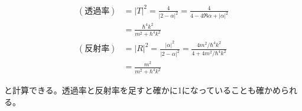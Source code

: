 \documentclass[uplatex,dvipdfmx]{jsarticle}
\begin{document}
\begin{align}
    (透過率) &= |T|^2 = \frac{4}{|2-\alpha|^2}
    = \frac{4}{4-4\Re{\alpha}+|\alpha|^2}\\
    &= \frac{\hbar^4k^2}{m^2+\hbar^4k^2} \\
    (反射率) &= |R|^2 = \frac{|\alpha|^2}{|2-\alpha|^2} = \frac{4m^2/\hbar^4k^2}{4+4m^2/\hbar^4k^2} \\
    &= \frac{m^2}{m^2+\hbar^4k^2}    
\end{align}

と計算できる。透過率と反射率を足すと確かに1になっていることも確かめられる。
\end{document}
